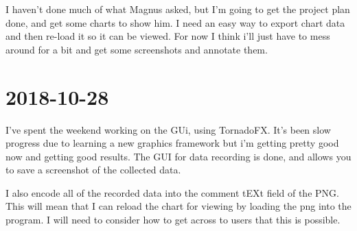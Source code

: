\documentclass{article}
\begin{document}
	I haven't done much of what Magnus asked, but I'm going to get the project plan done, and get some charts to show him. I need an easy way to export chart data and then re-load it so it can be viewed. For now I think i'll just have to mess around for a bit and get some screenshots and annotate them.
	
	\section{2018-10-28}
	I've spent the weekend working on the GUi, using TornadoFX. It's been slow progress due to learning a new graphics framework but i'm getting pretty good now and getting good results. The GUI for data recording is done, and allows you to save a screenshot of the collected data.
	
	I also encode all of the recorded data into the comment tEXt field of the PNG. This will mean that I can reload the chart for viewing by loading the png into the program. I will need to consider how to get across to users that this is possible.
		
\end{document}
